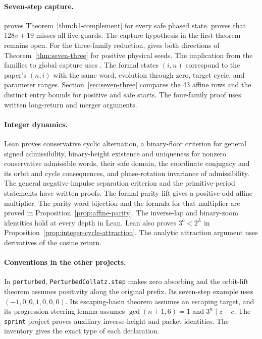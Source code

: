 \paragraph{Seven-step capture.}
 proves Theorem~\ref{thm:b1-complement}
for every safe phased state.  proves
that $128v+19$ misses all five guards. The capture hypothesis in the
first theorem remains open. For the three-family reduction,
 gives both
directions of Theorem~\ref{thm:seven-three} for positive physical seeds.
The implication from the families to global capture uses .
The formal states $(i,n)$ correspond to the paper's $(n,i)$ with the same
word, evolution through zero, target cycle, and parameter ranges.
Section~\ref{sec:seven-three} compares the 43 affine rows and the distinct
entry bounds for positive and safe starts. The four-family proof uses
written long-return and merger arguments.

\paragraph{Integer dynamics.}
Lean proves conservative cyclic alternation, a binary-floor criterion for
general signed admissibility, binary-height existence and uniqueness for
nonzero conservative admissible words, their safe domain, the coordinate
conjugacy and its orbit and cycle consequences, and phase-rotation
invariance of admissibility. The general negative-impulse separation
criterion and the primitive-period statements have written proofs.
The formal parity lift gives a positive odd affine multiplier. The
parity-word bijection and the formula for that multiplier are proved in
Proposition~\ref{prop:affine-parity}. The inverse-lap and binary-zoom
identities hold at every depth in Lean. Lean also proves $3^o<2^L$ in
Proposition~\ref{prop:integer-cycle-attraction}. The analytic attraction
argument uses derivatives of the cosine return.

\paragraph{Conventions in the other projects.}
In \texttt{perturbed}, \texttt{PerturbedCollatz.step} makes zero
absorbing and the orbit-lift theorem assumes positivity along the
original prefix. Its seven-step example uses $(-1,0,0,1,0,0,0)$.
Its escaping-basin theorem assumes an escaping target, and its
progression-steering lemma assumes $\gcd(n+1,6)=1$ and $3^n\mid z-c$.
The \texttt{sprint} project proves auxiliary inverse-height and packet
identities. The inventory gives the exact type of each declaration.

